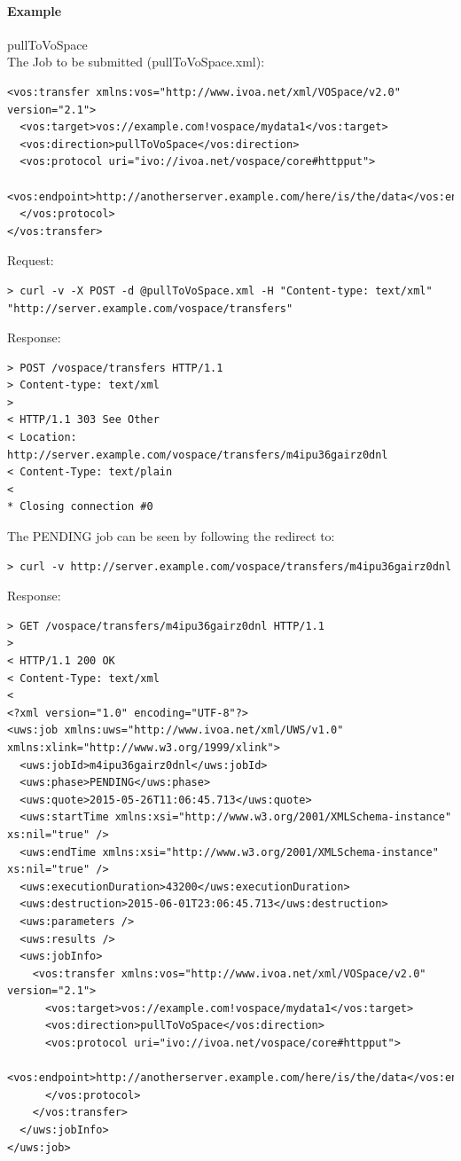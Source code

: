 \documentclass[11pt,a4paper]{ivoa}
\begin{document}
\paragraph{Example}
pullToVoSpace
\\[5px]
\noindent
The Job to be submitted (pullToVoSpace.xml):
\begin{lstlisting}
<vos:transfer xmlns:vos="http://www.ivoa.net/xml/VOSpace/v2.0" version="2.1">
  <vos:target>vos://example.com!vospace/mydata1</vos:target>
  <vos:direction>pullToVoSpace</vos:direction>
  <vos:protocol uri="ivo://ivoa.net/vospace/core#httpput">
    <vos:endpoint>http://anotherserver.example.com/here/is/the/data</vos:endpoint>
  </vos:protocol>
</vos:transfer>
\end{lstlisting}
Request:
\begin{lstlisting}
> curl -v -X POST -d @pullToVoSpace.xml -H "Content-type: text/xml" "http://server.example.com/vospace/transfers"
\end{lstlisting}
Response:
\begin{lstlisting}
> POST /vospace/transfers HTTP/1.1
> Content-type: text/xml
>
< HTTP/1.1 303 See Other
< Location: http://server.example.com/vospace/transfers/m4ipu36gairz0dnl
< Content-Type: text/plain
<
* Closing connection #0
\end{lstlisting}
The PENDING job can be seen by following the redirect to:
\begin{lstlisting}
> curl -v http://server.example.com/vospace/transfers/m4ipu36gairz0dnl
\end{lstlisting}
Response:
\begin{lstlisting}
> GET /vospace/transfers/m4ipu36gairz0dnl HTTP/1.1
>
< HTTP/1.1 200 OK
< Content-Type: text/xml
<
<?xml version="1.0" encoding="UTF-8"?>
<uws:job xmlns:uws="http://www.ivoa.net/xml/UWS/v1.0" xmlns:xlink="http://www.w3.org/1999/xlink">
  <uws:jobId>m4ipu36gairz0dnl</uws:jobId>
  <uws:phase>PENDING</uws:phase>
  <uws:quote>2015-05-26T11:06:45.713</uws:quote>
  <uws:startTime xmlns:xsi="http://www.w3.org/2001/XMLSchema-instance" xs:nil="true" />
  <uws:endTime xmlns:xsi="http://www.w3.org/2001/XMLSchema-instance" xs:nil="true" />
  <uws:executionDuration>43200</uws:executionDuration>
  <uws:destruction>2015-06-01T23:06:45.713</uws:destruction>
  <uws:parameters />
  <uws:results />
  <uws:jobInfo>
    <vos:transfer xmlns:vos="http://www.ivoa.net/xml/VOSpace/v2.0" version="2.1">
      <vos:target>vos://example.com!vospace/mydata1</vos:target>
      <vos:direction>pullToVoSpace</vos:direction>
      <vos:protocol uri="ivo://ivoa.net/vospace/core#httpput">
        <vos:endpoint>http://anotherserver.example.com/here/is/the/data</vos:endpoint>
      </vos:protocol>
    </vos:transfer>
  </uws:jobInfo>
</uws:job>
\end{lstlisting}
\end{document}
